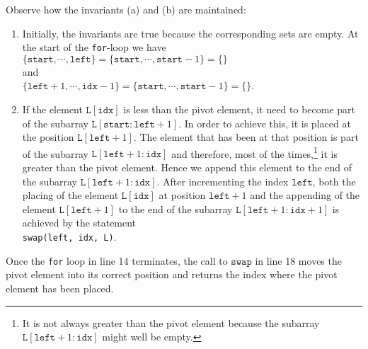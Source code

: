 \begin{enumerate}
      Observe how the invariants (a) and (b) are maintained:
      \begin{enumerate}
      \item Initially, the invariants are true because the corresponding sets are empty.
            At the start of the \texttt{for}-loop we have
            \\[0.2cm]
            \hspace*{1.3cm}
            $\{ \mathtt{start}, \cdots, \mathtt{left} \} = \{ \mathtt{start}, \cdots, \mathtt{start} - 1\} = \{\}$
            \\
            and
            \\
            \hspace*{1.3cm}
            $\{ \mathtt{left}+1,\cdots,\mathtt{idx}-1\} =  \{ \mathtt{start},\cdots,\mathtt{start}-1\}=\{\}$.
      \item If the element $\mathtt{L[idx]}$ is less than the
            pivot element, it need to become part of the subarray $\mathtt{L}[\mathtt{start}:\mathtt{left}+1]$.  In order to
            achieve this, it is placed at the position $\mathtt{L}[\mathtt{left}+1]$.  The element that has been at
            that position is part of the subarray $\mathtt{L}[\mathtt{left}+1:\mathtt{idx}]$ and therefore,
            most of the times,\footnote{
              It is not always greater than the pivot element
              because the subarray $\mathtt{L}[\mathtt{left}+1:\mathtt{idx}]$ might well be empty.}
            it is greater than the pivot element.  
            Hence we append this element to the end of the subarray
            $\mathtt{L}[\mathtt{left}+1:\mathtt{idx}]$.  After incrementing the index $\mathtt{left}$,
            both the placing of the element $\mathtt{L[idx]}$ at position $\mathtt{left}+1$ and the appending
            of the element $\mathtt{L}[\mathtt{left}+1]$ to the end of the subarray
            $\mathtt{L}[\mathtt{left}+1:\mathtt{idx}+1]$ is achieved by the statement
            \\[0.2cm]
            \hspace*{1.3cm}
            \texttt{swap(left, idx, L)}.            
      \end{enumerate}
      Once the \texttt{for} loop in line 14 terminates, the call to $\mathtt{swap}$ in line 18 moves
      the pivot element into its correct position and returns the index where the pivot element has been
      placed. 
\end{enumerate}


